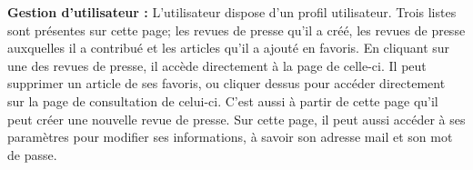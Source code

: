 	\textbf{Gestion d'utilisateur :} L'utilisateur dispose d'un profil utilisateur. Trois listes sont présentes sur cette page; les revues de presse qu'il a créé, les revues de presse auxquelles il a contribué et les articles qu'il a ajouté en favoris. En cliquant sur une des revues de presse, il accède directement à la page de celle-ci. Il peut supprimer un article de ses favoris, ou cliquer dessus pour accéder directement sur la page de consultation de celui-ci. C'est aussi à partir de cette page qu'il peut créer une nouvelle revue de presse. Sur cette page, il peut aussi accéder à ses paramètres pour modifier ses informations, à savoir son adresse mail et son mot de passe.